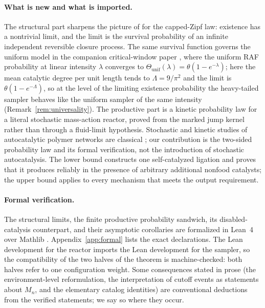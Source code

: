 \documentclass[11pt,letterpaper]{article}
\theoremstyle{plain}
\theoremstyle{definition}
\theoremstyle{remark}
\numberwithin{equation}{section}
\begin{document}
\paragraph{What is new and what is imported.}
The structural part sharpens the picture of \cite{hordijk2016variable} for the capped-Zipf law: existence has a nontrivial limit, and the limit is the survival probability of an infinite independent reversible closure process. The same survival function governs the uniform model in the companion critical-window paper \cite{criticalwindow2026}, where the uniform RAF probability at linear intensity $\lambda$ converges to $\Theta_{\mathrm{unif}}(\lambda)=\theta(1-e^{-\lambda})$; here the mean catalytic degree per unit length tends to $\Lambda=9/\pi^2$ and the limit is $\theta(1-e^{-\Lambda})$, so at the level of the limiting existence probability the heavy-tailed sampler behaves like the uniform sampler of the same intensity (Remark~\ref{rem:universality}). The productive part is a kinetic probability law for a literal stochastic mass-action reactor, proved from the marked jump kernel rather than through a fluid-limit hypothesis. Stochastic and kinetic studies of autocatalytic polymer networks are classical \cite{farmer1986autocatalytic,filisetti2011stochastic,giri2012origin}; our contribution is the two-sided probability law and its formal verification, not the introduction of stochastic autocatalysis. The lower bound constructs one self-catalyzed ligation and proves that it produces reliably in the presence of arbitrary additional nonfood catalysts; the upper bound applies to every mechanism that meets the output requirement.

\paragraph{Formal verification.}
The structural limits, the finite productive probability sandwich, its disabled-catalysis counterpart, and their asymptotic corollaries are formalized in Lean~4 \cite{demoura2021lean4} over Mathlib \cite{mathlib2020}. Appendix~\ref{app:formal} lists the exact declarations. The Lean development for the reactor imports the Lean development for the sampler, so the compatibility of the two halves of the theorem is machine-checked: both halves refer to one configuration weight. Some consequences stated in prose (the environment-level reformulation, the interpretation of cutoff events as statements about $M_n$, and the elementary catalog identities) are conventional deductions from the verified statements; we say so where they occur.
\end{document}
